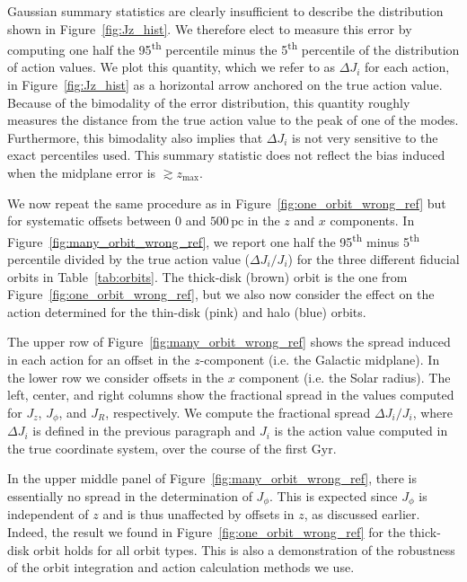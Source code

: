 \documentclass[twocolumn]{aastex62}
\newcommand{\pc}{\text{pc}}
\newcommand{\Gyr}{\text{Gyr}}
\newcommand{\uth}{\textsuperscript{th}}
\newcommand{\thincolor}{pink}
\newcommand{\thickcolor}{brown}
\newcommand{\halocolor}{blue}
\begin{document}
Gaussian summary statistics are clearly insufficient to describe the distribution shown in
Figure~\ref{fig:Jz_hist}. We therefore elect to measure this error by computing one
half the 95\uth{} percentile minus the 5\uth{} percentile of the distribution
of action values. We plot this quantity, which we refer to as $\Delta J_i$ for each action, in Figure~\ref{fig:Jz_hist} as a
horizontal arrow anchored on the true action value. Because of the bimodality
of the error distribution, this quantity roughly measures the distance from
the true action value to the peak of one of the modes. Furthermore, this
bimodality also implies that $\Delta J_i$ is not very sensitive to the exact
percentiles used. This summary statistic does not reflect the bias induced
when the midplane error is $\gtrsim z_{\text{max}}$.

We now repeat the same procedure as in Figure~\ref{fig:one_orbit_wrong_ref}
but for systematic offsets between $0$ and $500\,\pc$ in the $z$ and $x$
components. In Figure~\ref{fig:many_orbit_wrong_ref}, we report one half the
95\uth{} minus 5\uth{} percentile divided by the true action value ($\Delta
J_i/J_i$) for the three different fiducial orbits in Table~\ref{tab:orbits}.
The thick-disk (\thickcolor) orbit is the one from
Figure~\ref{fig:one_orbit_wrong_ref}, but we also now consider the effect on
the action determined for the thin-disk (\thincolor) and halo (\halocolor)
orbits.

The upper row of Figure~\ref{fig:many_orbit_wrong_ref} shows the spread
induced in each action for an offset in the $z$-component (i.e. the Galactic
midplane). In the lower row we consider offsets in the $x$ component (i.e. the
Solar radius). The left, center, and right columns show the fractional spread
in the values computed for $J_z$, $J_{\phi}$, and $J_R$, respectively. We
compute the fractional spread $\Delta J_i/J_i$, where $\Delta J_i$ is defined
in the previous paragraph and $J_i$ is the action value computed in the true
coordinate system, over the course of the first $\Gyr$.

In the upper middle panel of Figure~\ref{fig:many_orbit_wrong_ref}, there is
essentially no spread in the determination of $J_{\phi}$. This is expected
since $J_{\phi}$ is independent of $z$ and is thus unaffected by offsets in
$z$, as discussed earlier. Indeed, the result we found in
Figure~\ref{fig:one_orbit_wrong_ref} for the thick-disk orbit holds for all
orbit types. This is also a demonstration of the robustness of the orbit
integration and action calculation methods we use.
 
\end{document}
